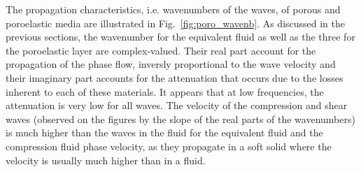 The propagation characteristics, i.e. wavenumbers of the waves, of porous and poroelastic media are illustrated in Fig.~\ref{fig:poro_wavenb}. As discussed in the previous sections, the wavenumber for the equivalent fluid as well as the three for the poroelastic layer are complex-valued. Their real part account for the propagation of the phase flow, inversly proportional to the wave velocity and their imaginary part accounts for the attenuation that occurs due to the losses inherent to each of these materials. It appears that at low frequencies, the attenuation is very low for all waves. The velocity of the compression and shear waves (observed on the figures by the slope of the real parts of the wavenumbers) is much higher than the waves in the fluid for the equivalent fluid and the compression fluid phase velocity, as they propagate in a soft solid where the velocity is usually much higher than in a fluid. 